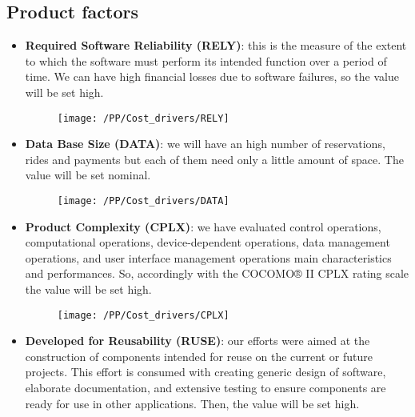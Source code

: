 \subsection{Product factors}
\begin{itemize}
    \item \textbf{Required Software Reliability (RELY)}: this is the measure of the extent to which the software must perform its intended function over a period of time. We can have high financial losses due to software failures, so the value will be set high.
    \begin{figure}[!ht]
      \centering
      \vspace{0.2cm}
      \texttt{[image: /PP/Cost\_drivers/RELY]}\\
      \vspace{0.2cm}
      \label{fig:RELY} 
    \end{figure}
    \item \textbf{Data Base Size (DATA)}: we will have an high number of reservations, rides and payments but each of them need only a little amount of space. The value will be set nominal.
    \begin{figure}[!ht]
      \centering
      \vspace{0.2cm}
      \texttt{[image: /PP/Cost\_drivers/DATA]}\\
      \vspace{0.2cm}
      \label{fig:DATA} 
    \end{figure}
    \item \textbf{Product Complexity (CPLX)}: we have evaluated control operations, computational operations, device-dependent operations, data management operations, and user interface management operations main characteristics and performances. So, accordingly with the COCOMO® II CPLX rating scale the value will be set high.
	  \begin{figure}[!ht]
      \centering
      \vspace{0.2cm}
      \texttt{[image: /PP/Cost\_drivers/CPLX]}\\
      \vspace{0.2cm}
      \label{fig:CPLX} 
    \end{figure}
    \item \textbf{Developed for Reusability (RUSE)}: our efforts were aimed at the construction of components intended for reuse on the current or future projects. This effort is consumed with creating generic design of software, elaborate documentation, and extensive testing to ensure components are ready for use in other applications. Then, the value will be set high.

\end{itemize}
